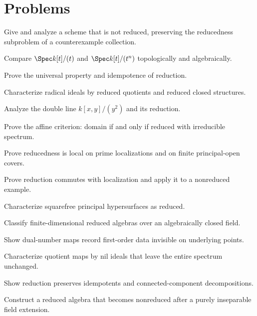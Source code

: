 \section{Problems}
\ifdefined\FullProblemDossiers

\else
\begin{problem}
Give and analyze a scheme that is not reduced, preserving the reducedness subproblem of a
counterexample collection.
\end{problem}
\begin{problem}
Compare $\Spec k[t]/(t)$ and $\Spec k[t]/(t^n)$ topologically and algebraically.
\end{problem}
\begin{problem}
Prove the universal property and idempotence of reduction.
\end{problem}
\begin{problem}
Characterize radical ideals by reduced quotients and reduced closed structures.
\end{problem}
\begin{problem}
Analyze the double line $k[x,y]/(y^2)$ and its reduction.
\end{problem}
\begin{problem}
Prove the affine criterion: domain if and only if reduced with irreducible spectrum.
\end{problem}
\begin{problem}
Prove reducedness is local on prime localizations and on finite principal-open covers.
\end{problem}
\begin{problem}
Prove reduction commutes with localization and apply it to a nonreduced example.
\end{problem}
\begin{problem}
Characterize squarefree principal hypersurfaces as reduced.
\end{problem}
\begin{problem}
Classify finite-dimensional reduced algebras over an algebraically closed field.
\end{problem}
\begin{problem}
Show dual-number maps record first-order data invisible on underlying points.
\end{problem}
\begin{problem}
Characterize quotient maps by nil ideals that leave the entire spectrum unchanged.
\end{problem}
\begin{problem}
Show reduction preserves idempotents and connected-component decompositions.
\end{problem}
\begin{problem}
Construct a reduced algebra that becomes nonreduced after a purely inseparable field extension.
\end{problem}
\fi

